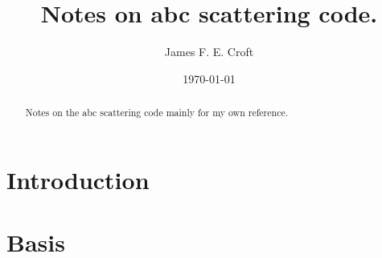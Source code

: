 \documentclass[aps,pra,onecolumn,showpacs,floatfix]{revtex4}
\begin{document}
\title{Notes on abc scattering code.}
\author{James F. E. Croft}
\affiliation{}

\date{\today}

\begin{abstract}
Notes on the abc scattering code mainly for my own reference.
\end{abstract}

\pacs{}

\maketitle
%
\section{Introduction}
\section{Basis}
\begin{acknowledgments}
\end{acknowledgments}


\end{document}
